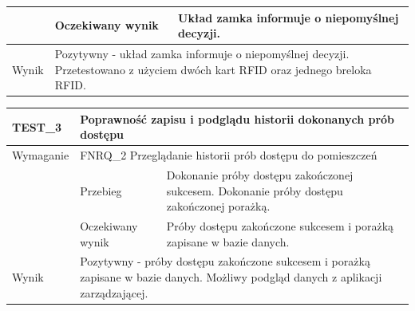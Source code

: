 \begin{table}[h!]
\begin{subtable}[c]{\textwidth}
\begin{tabular}{|p{2cm}|p{}|p{}|}
                    \cellcolor[gray]{0.8}                      & Oczekiwany wynik   & Układ zamka informuje o niepomyślnej decyzji.                                                 \\ \hline
                    \cellcolor[gray]{0.8} Wynik                 & \multicolumn{2}{p{12cm}|}{Pozytywny - układ zamka informuje o niepomyślnej decyzji. Przetestowano z użyciem dwóch kart RFID oraz jednego breloka RFID.}                                                                                  \\ \hline
                    \end{tabular}%
                \label{tbl:test2}
                \vspace{10mm}           
            \end{subtable}
        \quad%
            \begin{subtable}[c]{\textwidth}
                \centering
                    \begin{tabular}{|p{2cm}|p{}|p{}|}
                    \hline
                    TEST\_3               & \multicolumn{2}{l|}{\textbf{Poprawność zapisu i podglądu historii dokonanych prób dostępu}}                                                            \\ \hline
                    \cellcolor[gray]{0.8} Wymaganie             & \multicolumn{2}{p{12cm}|}{FNRQ\_2 Przeglądanie historii prób dostępu do pomieszczeń}                                                                                    \\ \hline
                    \cellcolor[gray]{0.8} \multirow{2}{*}{Opis} & Przebieg           & Dokonanie próby dostępu zakończonej sukcesem. Dokonanie próby dostępu zakończonej porażką.                                    \\ \cline{2-3} 
                    \cellcolor[gray]{0.8}                      & Oczekiwany wynik   & Próby dostępu zakończone sukcesem i porażką zapisane w bazie danych.                                                 \\ \hline
                    \cellcolor[gray]{0.8} Wynik                 & \multicolumn{2}{p{12cm}|}{Pozytywny - próby dostępu zakończone sukcesem i porażką zapisane w bazie danych. Możliwy podgląd danych z aplikacji zarządzającej.}                                                                                  \\ \hline
                    \end{tabular}%
                \label{tbl:test3}
                \vspace{10mm}           
            \end{subtable}
            \label{tbl:tests}
        \end{table}
    
